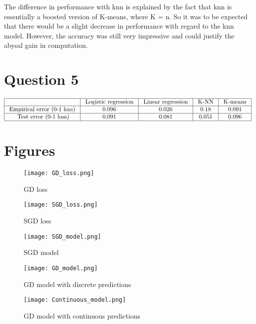 \documentclass{article}
\begin{document}
The difference in performance with knn is explained by the fact that knn is essentially a boosted version of K-means, where K = n. So it was to be expected that there would be a slight decrease in performance with regard to the knn model. However, the accuracy was still very impressive and could justify the abysal gain in computation.

\section{Question 5}

$$\begin{array}{|c|c|c|c|c|}
    \hline & \text { Logistic\ regression } & \text { Linear\ regression } & \text { K-NN } & \text { K-means }\\
    \hline \text { Empirical\ error\ (0-1\ loss) } & 0.096 & 0.026 & 0.18 & 0.091 \\
    \hline \text { Test error\ (0-1\ loss)} & 0.091 & 0.081 & 0.051 & 0.096 \\
    \hline
    \end{array}$$

\section{Figures}

\begin{figure}[h]
\centering
\texttt{[image: GD\_loss.png]}
\caption{GD loss}
\end{figure}

\begin{figure}[h]
\centering
\texttt{[image: SGD\_loss.png]}
\caption{SGD loss}
\end{figure}

\begin{figure}[h]
\centering
\texttt{[image: SGD\_model.png]}
\caption{SGD model}
\end{figure}

\begin{figure}[h]
\centering
\texttt{[image: GD\_model.png]}
\caption{GD model with discrete predictions}
\end{figure}

\begin{figure}[h]
\centering
\texttt{[image: Continuous\_model.png]}
\caption{GD model with continuous predictions}
\end{figure}
\end{document}
